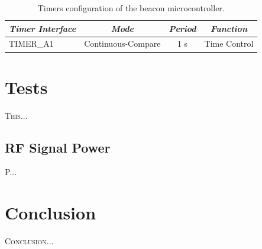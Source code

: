 \documentclass[12pt]{book}
\begin{document}
\begin{table}[!h]
	\begin{center}
		\begin{tabular}{lccc}
			\toprule[1.5pt]
			\textit{Timer Interface} & \textit{Mode} & \textit{Period} & \textit{Function} \\
			\midrule
			TIMER\_A1 & Continuous-Compare & 1 s & Time Control \\
			\bottomrule[1.5pt]
		\end{tabular}
		\caption{Timers configuration of the beacon microcontroller.}
		\label{tab:beacon-uc-timers-config}
	\end{center}
\end{table}


\chapter{Tests}

\lettrine{T}{his}...

\section{RF Signal Power}

P...


\chapter{Conclusion} \label{ch:conclusion}

\lettrine{C}{onclusion}...



\end{document}
